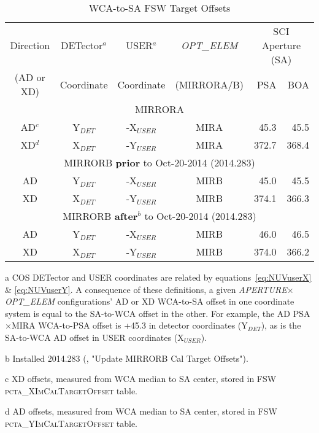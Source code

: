 \begin{center}
\begin{table}[htb!]
\centering
\vspace{-0.1cm}
\footnotesize
	\begin{threeparttable}
	\caption[\textsc{pcta\_[X,Y]ImCalTargetOffset} Values]{ WCA-to-SA FSW Target Offsets}
		\begin{tabular*}{.95\linewidth}{@{\extracolsep{\fill}}ccccrr}
		\toprule
		Direction & DETector$^{a}$ & USER$^{a}$ & \textit{OPT\_ELEM}  &	\multicolumn{2}{c}{SCI Aperture (SA)}\\
		(AD or XD) & Coordinate &	Coordinate &	(MIRRORA/B) & PSA	&	BOA\\
		\bottomrule
		\midrule
		\multicolumn{6}{c}{MIRRORA}\\
		\midrule
		AD$^c$	&	Y$_{DET}$	&	-X$_{USER}$	&	MIRA	&	45.3	&	45.5 \\
		XD$^d$	&	X$_{DET}$	&	-Y$_{USER}$	&	MIRA	&	372.7	&	368.4 \\
		\midrule
		\multicolumn{6}{c}{MIRRORB {\bf prior} to Oct-20-2014 (2014.283)}\\
		\midrule
		AD	&	Y$_{DET}$	&	-X$_{USER}$	&	MIRB	&	45.0	&	45.5 \\
		XD	&	X$_{DET}$	&	-Y$_{USER}$	&	MIRB	&	374.1	&	366.3 \\
		\midrule
		\multicolumn{6}{c}{MIRRORB {\bf after}$^{b}$ to Oct-20-2014 (2014.283)}\\
		\midrule
		AD	&	Y$_{DET}$	&	-X$_{USER}$	&	MIRB	&	46.0	&	46.5 \\
		XD	&	X$_{DET}$	&	-Y$_{USER}$	&	MIRB	&	374.0	&	366.2 \\
		\bottomrule
		\end{tabular*}
		\label{tab:pctaWCA2SANIM}
		\scriptsize
		\begin{tablenotes}
			\item[a] COS DETector and USER coordinates are related by equations~\ref{eq:NUVuserX} \& \ref{eq:NUVuserY}. A consequence of
			these definitions, a given \textit{APERTURE}$\times$\textit{OPT\_ELEM} configurations' AD or XD WCA-to-SA offset in one coordinate system is equal to the SA-to-WCA offset in the other.
			For example, the AD PSA$\times$MIRA WCA-to-PSA offset is +45.3 in detector coordinates (Y$_{DET}$), as is the SA-to-WCA AD offset in USER coordinates (X$_{USER}$).
			\item[b] Installed 2014.283 (, "Update MIRRORB Cal Target Offsets").
			\item[c] XD  offsets, measured from WCA median to  SA center, stored in  FSW \textsc{pcta\_XImCalTargetOffset} table.
			\item[d] AD  offsets, measured from WCA  median to SA center, stored in  FSW \textsc{pcta\_YImCalTargetOffset} table.
		\end{tablenotes}
		\normalsize
	\end{threeparttable}
\normalsize
\end{table}
\end{center}

